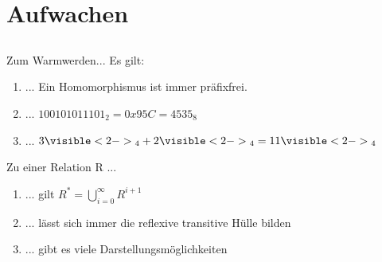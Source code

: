 \section[Einstieg]{Aufwachen}
\subsection*{}
\begin{frame}{Zum Warmwerden...}
  Es gilt:
    \begin{enumerate}
    \item { 
    ... Ein Homomorphismus ist immer präfixfrei.
    }
    \item { 
    ... $100101011101_2 = 0x95C = 4535_8$
    }
    \item { 
    ... $3{\visible<2->{_4}} + 2{\visible<2->{_4}} = 11{\visible<2->{_4}}$
    }
    \end{enumerate}

  Zu einer Relation R ...
    \begin{enumerate}
    \item { 
    ... gilt $R^* = \bigcup_{i=0}^{\infty} R^{i+1}$
    }
    \item { 
    ... lässt sich immer die reflexive transitive Hülle bilden
    }
    \item { 
    ... gibt es viele Darstellungsmöglichkeiten
    }
    \end{enumerate}
\end{frame}
